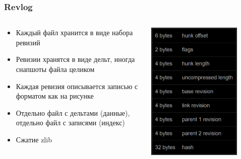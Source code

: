 \documentclass{../cscslides}
\begin{document}
    \begin{frame}
        \frametitle{Revlog}
        \begin{columns}
            \begin{column}{0.6\textwidth}
                \begin{itemize}
                    \item Каждый файл хранится в виде набора ревизий
                    \item Ревизии хранятся в виде дельт, иногда снапшоты файла целиком
                    \item Каждая ревизия описывается записью с форматом как на рисунке
                    \item Отдельно файл с дельтами (данные), отдельно файл с записями (индекс)
                    \item Сжатие zlib
                \end{itemize}
            \end{column}
            \begin{column}{0.4\textwidth}
                \begin{center}
                    \includegraphics[width=0.8\textwidth]{revlogBlack.png}
                \end{center}
            \end{column}
        \end{columns}
    \end{frame}
\end{document}
